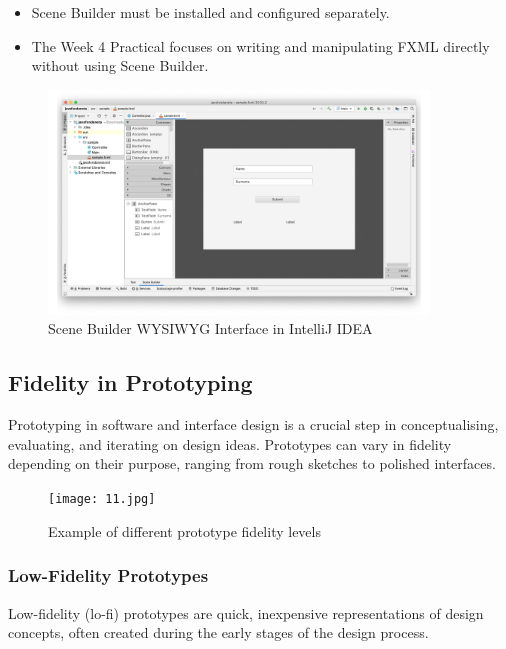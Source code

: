 \documentclass{article}
\begin{document}
\begin{itemize}
    \item Scene Builder must be installed and configured separately.
    \item The Week 4 Practical focuses on writing and manipulating FXML directly without using Scene Builder.
\end{itemize}

\begin{figure}[H]
    \centering
    \includegraphics[width=0.9\textwidth]{scene-builder.png}
    \caption{Scene Builder WYSIWYG Interface in IntelliJ IDEA}
\end{figure}

\subsection{Fidelity in Prototyping}

Prototyping in software and interface design is a crucial step in conceptualising, evaluating, and iterating on design ideas. Prototypes can vary in fidelity depending on their purpose, ranging from rough sketches to polished interfaces.

\begin{figure}[h!]
\centering
\texttt{[image: 11.jpg]}
\caption{Example of different prototype fidelity levels}
\label{fig:prototype-fidelity}
\end{figure}

\subsubsection{Low-Fidelity Prototypes}

Low-fidelity (lo-fi) prototypes are quick, inexpensive representations of design concepts, often created during the early stages of the design process.
\end{document}
